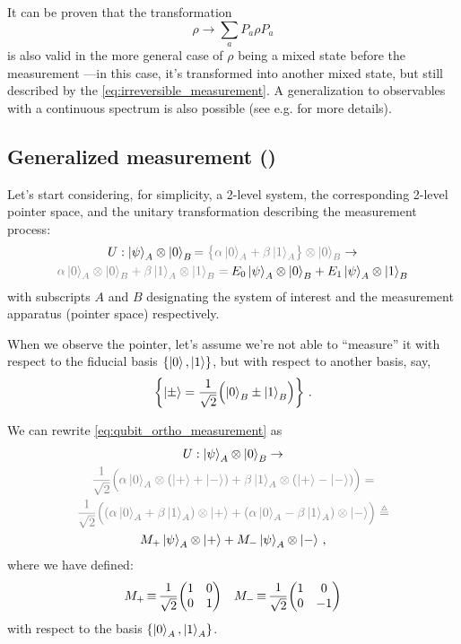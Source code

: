 It can be proven that the transformation
\begin{equation}\label{eq:irreversible_measurement}
  \rho \rightarrow \sum_a P_a \rho P_a
\end{equation}
is also valid in the more general case of $\rho$ being a mixed state before the measurement
---in this case, it's transformed into another mixed state,
but still described by the \eqref{eq:irreversible_measurement}.
A generalization to observables with a continuous spectrum is also possible
(see e.g. \cite[Section 3.1.1]{PreskillNotes} for more details).


\subsection{Generalized measurement ()}
\label{subsec:POVM}

Let's start considering, for simplicity, a 2-level system,
the corresponding 2-level pointer space,
and the unitary transformation describing the measurement process:
\begin{multline}\label{eq:qubit_ortho_measurement}
  U:
    \ket{\psi}_A \ox \ket{0}_B
    {\color{gray}= \qty\big{\alpha\ket{0}_A + \beta\ket{1}_A} \ox \ket{0}_B}
  \rightarrow \\
    {\color{gray}\alpha\ket{0}_A \ox \ket{0}_B + \beta\ket{1}_A  \ox \ket{1}_B =}
    \:
    E_0\ket{\psi}_A \ox \ket{0}_B + E_1\ket{\psi}_A \ox \ket{1}_B
\end{multline}
with subscripts $A$ and $B$ designating the system of interest and
the measurement apparatus (pointer space) respectively.

When we observe the pointer, let's assume we're not
able to ``measure'' it with respect to the fiducial basis
$\left\{\ket{0}, \ket{1}\right\}$,
but with respect to another basis, say,
\begin{equation}\label{eq:pmbasis}
\left\{\ket{\pm} = \frac{1}{\sqrt{2}} \qty\Big(\ket{0}_B \pm \ket{1}_B)\right\} \,\text{.}
\end{equation}

We can rewrite \eqref{eq:qubit_ortho_measurement} as
\begin{multline}\label{eq:qubit_gen_measurement}
  U: \ket{\psi}_A \ox \ket{0}_B                   \rightarrow \\
  \color{gray}
  \frac{1}{\sqrt{2}} \qty\Big(
    \alpha\ket{0}_A \ox \qty(\ket{+}+\ket{-}) +
    \beta \ket{1}_A \ox \qty(\ket{+}-\ket{-})
  )                                               =           \\
  \color{gray}
  \frac{1}{\sqrt{2}} \qty\Big(
    \qty(\alpha\ket{0}_A + \beta\ket{1}_A) \ox \ket{+} +
    \qty(\alpha\ket{0}_A - \beta\ket{1}_A) \ox \ket{-}
  )                                               \eqbydef      \\
  M_+\ket{\psi}_A \ox \ket{+} + M_-\ket{\psi}_A \ox \ket{-}
  \,\text{,}
\end{multline}
where we have defined:
\begin{align*}
  &
  M_+ \repr \frac{1}{\sqrt{2}}\mqty(\imat{2})
  &
  M_- \repr \frac{1}{\sqrt{2}}\mqty(\dmat[0]{1, -1})
\end{align*}
with respect to the basis $\left\{\ket{0}_A, \ket{1}_A\right\}$.

